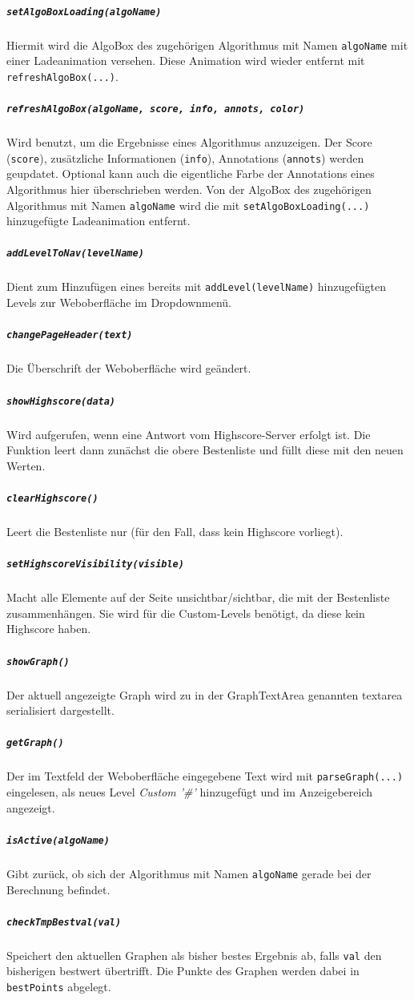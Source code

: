 \documentclass[a4paper,twocolumn]{scrartcl}
\begin{document}
    \subparagraph{\texttt{setAlgoBoxLoading(algoName)}} 
    Hiermit wird die AlgoBox des zugehörigen Algorithmus mit Namen \texttt{algoName} mit einer Ladeanimation versehen. Diese Animation wird wieder entfernt mit \texttt{refreshAlgoBox(...)}.
    \subparagraph{\texttt{refreshAlgoBox(algoName, score, info, annots, color)}} 
    Wird benutzt, um die Ergebnisse eines Algorithmus anzuzeigen. Der Score (\texttt{score}), zusätzliche Informationen (\texttt{info}), Annotations (\texttt{annots}) werden geupdatet. Optional kann auch die eigentliche Farbe der Annotations eines Algorithmus hier überschrieben werden.
    Von der AlgoBox des zugehörigen Algorithmus mit Namen \texttt{algoName} wird die mit \texttt{setAlgoBoxLoading(...)} hinzugefügte Ladeanimation entfernt.
    \subparagraph{\texttt{addLevelToNav(levelName)}} 
    Dient zum Hinzufügen eines bereits mit \texttt{addLevel(levelName)} hinzugefügten Levels zur Weboberfläche im Dropdownmenü.
    \subparagraph{\texttt{changePageHeader(text)}} 
    Die Überschrift der Weboberfläche wird geändert.
    \subparagraph{\texttt{showHighscore(data)}} 
    Wird aufgerufen, wenn eine Antwort vom Highscore-Server erfolgt ist. Die Funktion leert dann zunächst die obere Bestenliste und füllt diese mit den neuen Werten.
    \subparagraph{\texttt{clearHighscore()}} 
    Leert die Bestenliste nur (für den Fall, dass kein Highscore vorliegt).
    \subparagraph{\texttt{setHighscoreVisibility(visible)}} 
    Macht alle Elemente auf der Seite unsichtbar/sichtbar, die mit der Bestenliste zusammenhängen. Sie wird für die Custom-Levels benötigt, da diese kein Highscore haben.
    \subparagraph{\texttt{showGraph()}} 
    Der aktuell angezeigte Graph wird zu in der GraphTextArea genannten textarea serialisiert dargestellt.
    \subparagraph{\texttt{getGraph()}} 
    Der im Textfeld der Weboberfläche eingegebene Text wird mit \texttt{parseGraph(...)} eingelesen, als neues Level \textit{Custom '\#'} hinzugefügt und im Anzeigebereich angezeigt.
    \subparagraph{\texttt{isActive(algoName)}} 
    Gibt zurück, ob sich der Algorithmus mit Namen \texttt{algoName} gerade bei der Berechnung befindet.
    \subparagraph{\texttt{checkTmpBestval(val)}} 
    Speichert den aktuellen Graphen als bisher bestes Ergebnis ab, falls \texttt{val} den bisherigen bestwert übertrifft. Die Punkte des Graphen werden dabei in \texttt{bestPoints} abgelegt.
\end{document}
